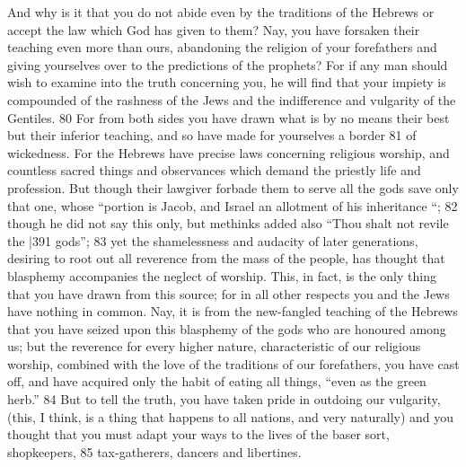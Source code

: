 And why is it that you do not abide even by the traditions of the Hebrews or accept the law which God has given to them? Nay, you have forsaken their teaching even more than ours, abandoning the religion of your forefathers and giving yourselves over to the predictions of the prophets? For if any man should wish to examine into the truth concerning you, he will find that your impiety is compounded of the rashness of the Jews and the indifference and vulgarity of the Gentiles. 80 For from both sides you have drawn what is by no means their best but their inferior teaching, and so have made for yourselves a border
81 of wickedness. For the Hebrews have precise laws concerning religious worship, and countless sacred things and observances which demand the priestly life and profession. But though their lawgiver forbade them to serve all the gods save only that one, whose ``portion is Jacob, and Israel an allotment of his inheritance ``;
82 though he did not say this only, but methinks added also ``Thou shalt not revile the
|391 gods''; 83 yet the shamelessness and audacity of later generations, desiring to root out all reverence from the mass of the people, has thought that blasphemy accompanies the neglect of worship. This, in fact, is the only thing that you have drawn from this source; for in all other respects you and the Jews have nothing in common. Nay, it is from the new-fangled teaching of the Hebrews that you have seized upon this blasphemy of the gods who are honoured among us; but the reverence for every higher nature, characteristic of our religious worship, combined with the love of the traditions of our forefathers, you have cast off, and have acquired only the habit of eating all things, ``even as the green herb.''
84 But to tell the truth, you have taken pride in outdoing our vulgarity, (this, I think, is a thing that happens to all nations, and very naturally) and you
thought that you must adapt your ways to the lives of the baser sort, shopkeepers, 85 tax-gatherers, dancers and libertines.

